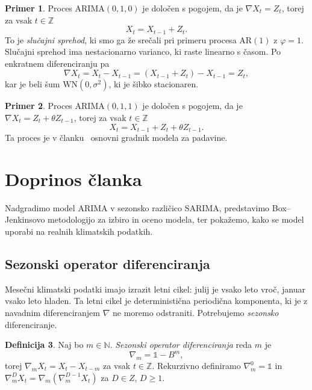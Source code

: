\documentclass[11pt]{amsart}
\newcommand{\N}{\mathbb{N}}
\newcommand{\Z}{\mathbb{Z}}
\newcommand{\WN}{\mathrm{WN}}
\theoremstyle{definition}
\newtheorem{definicija}{Definicija}[section]
\newtheorem{primer}[definicija]{Primer}
\theoremstyle{plain}
\begin{document}
\begin{primer}
    Proces $\mathrm{ARIMA}(0,1,0)$ je določen s pogojem, da je $\nabla X_t = Z_t$, torej za
    vsak $t \in \Z$
    \[
        X_t = X_{t-1} + Z_t.
    \]
    To je \emph{slučajni sprehod}, ki smo ga že srečali pri primeru procesa $\mathrm{AR}(1)$ 
    z $\varphi = 1$. Slučajni sprehod ima nestacionarno varianco, ki raste linearno s časom.
    Po enkratnem diferenciranju pa
    \[
        \nabla X_t = X_t - X_{t-1} = (X_{t-1} + Z_t) - X_{t-1} = Z_t,
    \]
    kar je beli šum $\WN(0, \sigma^2)$, ki je šibko stacionaren.
\end{primer}

\begin{primer}
    Proces $\mathrm{ARIMA}(0,1,1)$ je določen s pogojem, da je
    $\nabla X_t = Z_t + \theta Z_{t-1}$, torej za vsak $t \in \Z$
    \[
        X_t = X_{t-1} + Z_t + \theta Z_{t-1}.
    \]
    Ta proces je v članku~\cite{dimri2020} osnovni gradnik modela za padavine.
\end{primer}

\section{Doprinos članka}

Nadgradimo model $\mathrm{ARIMA}$ v sezonsko različico  $\mathrm{SARIMA}$,
predstavimo Box--Jenkinsovo metodologijo za izbiro in oceno modela, 
ter pokažemo, kako se model uporabi na realnih klimatskih podatkih.

\subsection*{Sezonski operator diferenciranja}

Mesečni klimatski podatki imajo izrazit letni cikel: julij je vsako leto vroč, januar 
vsako leto hladen. Ta letni cikel je deterministična periodična komponenta, ki je z 
navadnim diferenciranjem $\nabla$ ne moremo odstraniti. Potrebujemo \emph{sezonsko} 
diferenciranje.

\begin{definicija}
    Naj bo $m \in \N$. \emph{Sezonski operator diferenciranja} reda $m$ je
    \[
        \nabla_m = \mathds{1} - B^m,
    \]
    torej $\nabla_m X_t = X_t - X_{t-m}$ za vsak $t \in \Z$. Rekurzivno definiramo 
    $\nabla_m^0 = \mathds{1}$ in $\nabla_m^D X_t = \nabla_m(\nabla_m^{D-1} X_t)$ za 
    $D \in Z$, $D \geq 1$.
\end{definicija}
\end{document}
